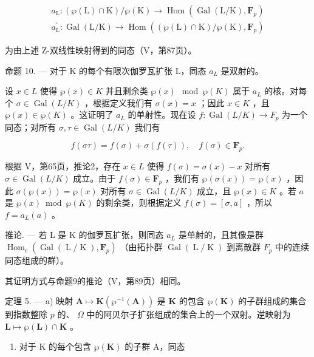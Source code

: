 \[
\begin{array}{l} a _ {\mathrm{L}} \colon (\wp (\mathrm{L}) \cap \mathrm{K}) / \wp (\mathrm{K}) \to \operatorname{Hom} \left(\operatorname{Gal} (\mathrm{L} / \mathrm{K}), \mathbf {F} _ {p}\right) \\ a _ {\mathrm{L}} ^ {\prime} \colon \operatorname{Gal} (\mathrm{L} / \mathrm{K}) \to \operatorname{Hom} \left((\wp (\mathrm{L}) \cap \mathrm{K}) / \wp (\mathrm{K}), \mathbf {F} _ {p}\right) \end{array}
\]

为由上述 Z-双线性映射得到的同态（V，第87页）。

命题 10. --- 对于 K 的每个有限次伽罗瓦扩张 L，同态 \(a_{L}\) 是双射的。

设 \(x \in L\) 使得 \(\wp(x) \in K\) 并且剩余类 \(\wp(x) \mod \wp(K)\) 属于 \(a_L\) 的核。对每个 \(\sigma \in \operatorname{Gal}(L/K)\) ，根据定义我们有 \(\sigma(x) = x\) ；因此 \(x \in K\) ，且 \(\wp(x) \in \wp(K)\) 。这证明了 \(a_L\) 的单射性。现在设 \(f: \operatorname{Gal}(L/K) \to F_p\) 为一个同态；对所有 \(\sigma, \tau \in \operatorname{Gal}(L/K)\) 我们有

\[
f (\sigma \tau) = f (\sigma) + \sigma (f (\tau)), \quad f (\sigma) \in \mathbf {F} _ {p}.
\]

根据 V，第65页，推论2，存在 \(x \in L\) 使得 \(f(\sigma) = \sigma(x) - x\) 对所有 \(\sigma \in \operatorname{Gal}(L/K)\) 成立。由于 \(f(\sigma) \in \mathbf{F}_p\) ，我们有 \(\wp(\sigma(x)) = \wp(x)\) ，因此 \(\sigma(\wp(x)) = \wp(x)\) 对所有 \(\sigma \in \operatorname{Gal}(L/K)\) 成立，且 \(\wp(x) \in K\) 。若 \(a\) 是 \(\wp(x) \bmod \wp(K)\) 的剩余类，则根据定义 \(f(\sigma) = [\sigma, a]\) ，所以 \(f = a_L(a)\) 。

推论. --- 若 L 是 K 的伽罗瓦扩张，则同态 \(a_{L}\) 是单射的，且其像是群 \(\operatorname{Hom}_{c}(\operatorname{Gal}(\operatorname{L}/\operatorname{K}), \mathbf{F}_{p})\) （由拓扑群 \(\operatorname{Gal}(\operatorname{L}/\operatorname{K})\) 到离散群 \(F_{p}\) 中的连续同态组成的群）。

其证明方式与命题9的推论（V，第89页）相同。

定理 5. --- a) 映射 \(\mathbf{A} \mapsto \mathbf{K}(\wp^{-1}(\mathbf{A}))\) 是 \(\mathbf{K}\) 的包含 \(\wp(\mathbf{K})\) 的子群组成的集合到指数整除 \(p\) 的、 \(\Omega\) 中的阿贝尔子扩张组成的集合上的一个双射。逆映射为 \(\mathbf{L} \mapsto \wp(\mathbf{L}) \cap \mathbf{K}\) 。

\begin{enumerate}
\def\labelenumi{\alph{enumi})}
\setcounter{enumi}{1}
\tightlist
\item
  对于 K 的每个包含 \(\wp(\mathbf{K})\) 的子群 A，同态
\end{enumerate}

